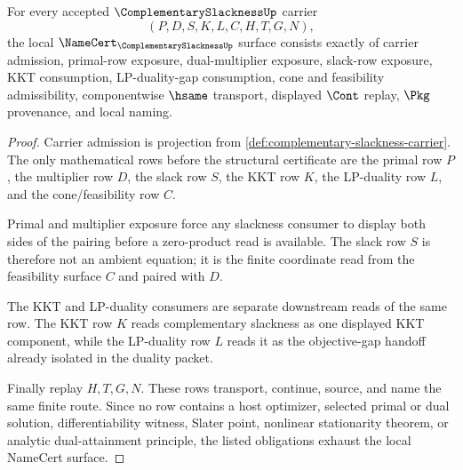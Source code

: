 \begin{theorem}
\label{thm:complementary-slackness-namecert-obligations}
For every accepted $\ComplementarySlacknessUp$ carrier
$$
(P,D,S,K,L,C,H,T,G,N),
$$
the local $\NameCert_{\ComplementarySlacknessUp}$ surface consists exactly of carrier admission, primal-row exposure, dual-multiplier exposure, slack-row exposure, KKT consumption, LP-duality-gap consumption, cone and feasibility admissibility, componentwise $\hsame$ transport, displayed $\Cont$ replay, $\Pkg$ provenance, and local naming.
\end{theorem}
\begin{proof}
Carrier admission is projection from \autoref{def:complementary-slackness-carrier}. The only mathematical rows before the structural certificate are the primal row $P$, the multiplier row $D$, the slack row $S$, the KKT row $K$, the LP-duality row $L$, and the cone/feasibility row $C$.

Primal and multiplier exposure force any slackness consumer to display both sides of the pairing before a zero-product read is available. The slack row $S$ is therefore not an ambient equation; it is the finite coordinate read from the feasibility surface $C$ and paired with $D$.

The KKT and LP-duality consumers are separate downstream reads of the same row. The KKT row $K$ reads complementary slackness as one displayed KKT component, while the LP-duality row $L$ reads it as the objective-gap handoff already isolated in the duality packet.

Finally replay $H,T,G,N$. These rows transport, continue, source, and name the same finite route. Since no row contains a host optimizer, selected primal or dual solution, differentiability witness, Slater point, nonlinear stationarity theorem, or analytic dual-attainment principle, the listed obligations exhaust the local NameCert surface.
\end{proof}

